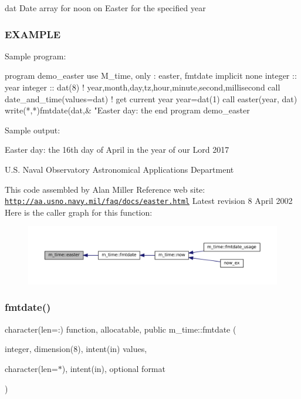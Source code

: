 dat Date array for noon on Easter for the specified year

\subsubsection*{E\+X\+A\+M\+P\+LE}

\begin{DoxyVerb}Sample program:

 program demo_easter
 use M_time, only : easter, fmtdate
 implicit none
 integer :: year
 integer :: dat(8) ! year,month,day,tz,hour,minute,second,millisecond
   call date_and_time(values=dat)  ! get current year
   year=dat(1)
   call easter(year, dat)
   write(*,*)fmtdate(dat,&
   "Easter day: the %
 end program demo_easter

Sample output:

 Easter day: the 16th day of April in the year of our Lord 2017
\end{DoxyVerb}


U.\+S. Naval Observatory Astronomical Applications Department

This code assembled by Alan Miller Reference web site\+: \href{http://aa.usno.navy.mil/faq/docs/easter.html}{\tt http\+://aa.\+usno.\+navy.\+mil/faq/docs/easter.\+html} Latest revision 8 April 2002 Here is the caller graph for this function\+:\nopagebreak
\begin{figure}[H]
\begin{center}
\leavevmode
\includegraphics[width=350pt]{namespacem__time_a5ccb70e20160fcf26bb403dbff1f138a_icgraph}
\end{center}
\end{figure}
\mbox{\label{namespacem__time_a2cb84c9b8af4f395b76aed76e1431328}} 
\subsubsection{\texorpdfstring{fmtdate()}{fmtdate()}}
{\footnotesize\ttfamily character(len=\+:) function, allocatable, public m\+\_\+time\+::fmtdate (\begin{DoxyParamCaption}\item[{integer, dimension(8), intent(in)}]{values,  }\item[{character(len=$\ast$), intent(in), optional}]{format }\end{DoxyParamCaption})}



